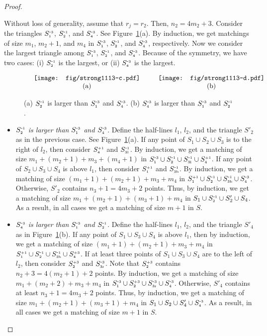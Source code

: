 \documentclass[11pt,a4paper]{article}
\newcommand{\SP}[2]{S^{\text{\tiny +#1}}_\text{\tiny #2}}
\newcommand{\SM}[2]{S^{\text{-\tiny #1}}_\text{\tiny #2}}
\begin{document}
\begin{proof}
\begin{itemize}
Without loss of generality, assume that $r_j=r_2$. Then, $n_2=4m_2+3$. Consider the triangles $\SM{3}{1}$, $\SM{1}{2}$, and $\SM{3}{4}$. See Figure~\ref{Theta-six-fig2}(a). By induction, we get matchings of size $m_1$, $m_2+1$, and $m_4$ in $\SM{3}{1}$, $\SM{1}{2}$, and $\SM{3}{4}$, respectively. 
Now we consider the largest triangle among $\SM{3}{1}$, $\SM{1}{2}$, and $\SM{3}{4}$. Because of the symmetry, we have two cases: (i) $\SM{1}{2}$ is the largest, or (ii) $\SM{3}{4}$ is the largest.
\begin{figure}[h!]
  \centering
\setlength{\tabcolsep}{0in}
  $\begin{tabular}{cc}
\multicolumn{1}{m{.5\columnwidth}}{\centering\texttt{[image: fig/strong1113-c.pdf]}}
&\multicolumn{1}{m{.5\columnwidth}}{\centering\texttt{[image: fig/strong1113-d.pdf]}}
\\
(a) & (b)
\end{tabular}$
  \caption{(a) $\SM{1}{2}$ is larger than $\SM{3}{1}$ and $\SM{3}{4}$. (b) $\SM{3}{4}$ is larger than $\SM{3}{1}$ and $\SM{1}{2}$.}
\label{Theta-six-fig2}
\end{figure}
\begin{itemize}
 \item {\em $\SM{1}{2}$ is larger than $\SM{3}{1}$ and $\SM{3}{4}$.}
Define the half-lines $l_1$, $l_2$, and the triangle $S'_2$ as in the previous case. See Figure~\ref{Theta-six-fig2}(a). If any point of $S_1\cup S_2\cup S_3$ is to the right of $l_2$, then consider $\SP{1}{4}$ and $\SM{1}{3l}$. By induction, we get a matching of size $m_1+(m_2+1)+m_3+(m_4+1)$ in $\SM{3}{1}\cup \SM{1}{2}\cup\SM{1}{3l}\cup \SP{1}{4}$. If any point of $S_2\cup S_3\cup S_4$ is above $l_1$, then consider $\SP{1}{1}$ and $\SM{1}{3b}$. By induction, we get a matching of size $(m_1+1)+(m_2+1)+m_3+m_4$ in $\SP{1}{1}\cup \SM{1}{2}\cup\SM{1}{3b}\cup \SM{3}{4}$. Otherwise, $S'_2$ contains $n_3+1=4m_3+2$ points. Thus, by induction, we get a matching of size $m_1+(m_2+1)+(m_3+1)+ m_4$ in $S_1\cup \SM{1}{2}\cup S'_2\cup S_4$. As a result, in all cases we get a matching of size $m+1$ in $S$.

\item {\em $\SM{3}{4}$ is larger than $\SM{3}{1}$ and $\SM{1}{2}$.}
Define the half-lines $l_1$, $l_2$, and the triangle $S'_4$ as in Figure~\ref{Theta-six-fig2}(b). If any point of $S_1\cup S_3\cup S_4$ is above $l_1$, then by induction, we get a matching of size $(m_1+1)+(m_2+1)+m_3+m_4$ in $\SP{1}{1}\cup \SM{1}{2}\cup\SM{1}{3b}\cup \SP{3}{4}$. If at least three points of $S_1\cup S_3\cup S_4$ are to the left of $l_2$, then consider $\SP{3}{2}$ and $\SM{3}{3r}$. Note that $\SP{3}{2}$ contains $n_2+3=4(m_2+1)+2$ points. By induction, we get a matching of size $m_1+(m_2+2)+m_3+m_4$ in $\SM{3}{1}\cup \SP{3}{2}\cup\SM{3}{3r}\cup \SM{3}{4}$. Otherwise, $S'_4$ contains at least $n_3+1=4m_3+2$ points. Thus, by induction, we get a matching of size $m_1+(m_2+1)+(m_3+1)+ m_4$ in $S_1\cup S_2\cup S'_4\cup \SM{3}{4}$. As a result, in all cases we get a matching of size $m+1$ in $S$.
\end{itemize}
\end{itemize}



\end{proof}
\end{document}
